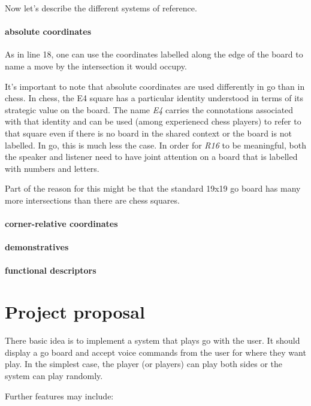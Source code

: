 \documentclass{scrartcl}
\begin{document}
\noindent Now let's describe the different systems of reference.

\paragraph{absolute coordinates}

As in line 18, one can use the coordinates labelled along the edge of the board
to name a move by the intersection it would occupy.

It's important to note that absolute coordinates are used differently 
in go than in chess.
In chess, the E4 square has a particular identity understood in terms of its
strategic value on the board. 
The name \textit{E4} carries the connotations associated with that identity
and can be used (among experienecd chess players) to refer to that square
even if there is no board in the shared context or the board is not labelled.
In go, this is much less the case. 
In order for \textit{R16} to be meaningful, both the speaker and listener
need to have joint attention on a board that is labelled with numbers and letters.

Part of the reason for this might be that the standard 19x19 go board has many
more intersections than there are chess squares. 

\paragraph{corner-relative coordinates}

\paragraph{demonstratives}

\paragraph{functional descriptors}

\section{Project proposal}

There basic idea is to implement a system that plays go with the user.
It should display a go board and accept voice commands from the user for
where they want play. In the simplest case, the player (or players) can
play both sides or the system can play randomly.

Further features may include:
\end{document}
